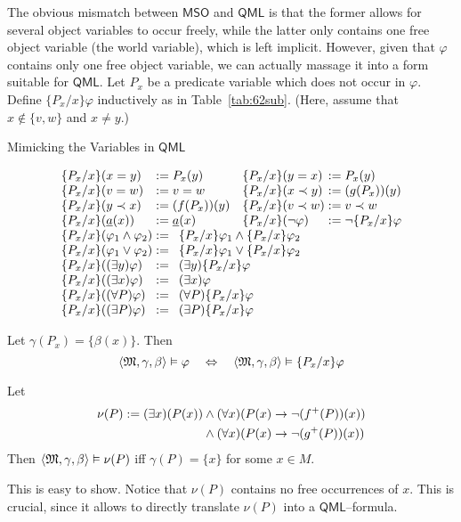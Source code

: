 The obvious mismatch between $\mathsf{MSO}$ and $\mathsf{QML}$ is that the
former allows for several object variables to occur freely,
while the latter only contains one free object variable (the world
variable), which is left implicit. However, given that $\varphi$
contains only one free object variable, we can actually massage it
into a form suitable for $\mathsf{QML}$. Let $P_x$ be a predicate
variable which does not occur in $\varphi$. Define
$\{P_x/x\}\varphi$ inductively as in Table~\ref{tab:62sub}. 
(Here, assume that $x \not\in \{v,w\}$ and $x \neq y$.)
\begin{table}
\caption{Mimicking the Variables in $\mathsf{QML}$}
\label{tab:62sub}
$$\begin{array}{l@{\; := \;}l@{\quad}l@{\; := \;}l}
\{P_x/x\}(x \doteq y) & P_x(y) &
\{P_x/x\}(y \doteq x)  & P_x(y) \\
\{P_x/x\}(v \doteq w) & v \doteq w & 
\{P_x/x\}(x \prec y) & (g(P_x))(y) \\
\{P_x/x\}(y \prec x)  & (f(P_x))(y) &
\{P_x/x\}(v \prec w) & v \prec w \\
\{P_x/x\}(\uli{a}(x)) & \uli{a}(x) &
\{P_x/x\}(\nicht \varphi) & \nicht \{P_x/x\}\varphi \\
\{P_x/x\}(\varphi_1 \und \varphi_2) & \multicolumn{2}{l}{%
\{P_x/x\}\varphi_1 \und \{P_x/x\}\varphi_2} \\
\{P_x/x\}(\varphi_1 \oder \varphi_2) & \multicolumn{2}{l}{%
\{P_x/x\}\varphi_1 \oder \{P_x/x\}\varphi_2} \\
\{P_x/x\}((\exists y)\varphi) & \multicolumn{2}{l}{%
(\exists y)\{P_x/x\}\varphi} \\
\{P_x/x\}((\exists x)\varphi) & \multicolumn{2}{l}{(\exists x)\varphi} \\
\{P_x/x\}((\forall P)\varphi) & \multicolumn{2}{l}{%
(\forall P)\{P_x/x\}\varphi} \\
\{P_x/x\}((\exists P)\varphi) & \multicolumn{2}{l}{%
(\exists P)\{P_x/x\}\varphi}
\end{array}$$
\end{table}
Let $\gamma(P_x) = \{\beta(x)\}$. Then
\begin{equation}
\langle \mathfrak{M}, \gamma, \beta\rangle \vDash \varphi
\quad\Leftrightarrow\quad
\langle \mathfrak{M}, \gamma, \beta\rangle \vDash \{P_x/x\}\varphi
\end{equation}
\begin{lem}
Let
\begin{equation}
\begin{split}
\nu(P) := (\exists x)(P(x)) & \wedge 
    (\forall x)(P(x) \rightarrow \neg (f^+(P))(x)) \\
    & \wedge (\forall x)(P(x) \rightarrow \neg (g^+(P))(x))
\end{split}
\end{equation}
Then $\langle \mathfrak{M}, \gamma, \beta\rangle \vDash \nu(P)$ iff
$\gamma(P) = \{x\}$ for some $x \in M$.
\end{lem}
This is easy to show. Notice that $\nu(P)$ contains no free
occurrences of $x$. This is crucial, since it allows to
directly translate $\nu(P)$ into a $\mathsf{QML}$--formula.

